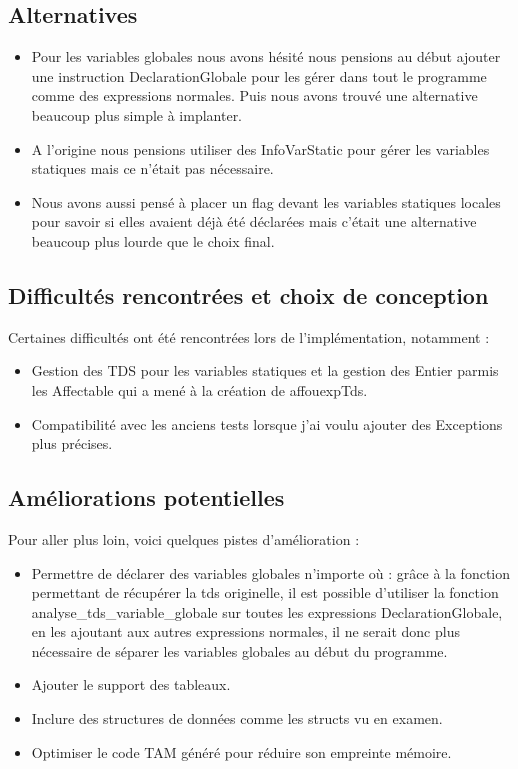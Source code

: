 \documentclass[a4paper,12pt]{article}
\begin{document}
\subsection{Alternatives}
\begin{itemize}
\item Pour les variables globales nous avons hésité nous pensions au début ajouter une instruction DeclarationGlobale pour les gérer dans tout le programme comme des expressions normales. Puis nous avons trouvé une alternative beaucoup plus simple à implanter.

\item A l'origine nous pensions utiliser des InfoVarStatic pour gérer les variables statiques mais ce n'était pas nécessaire.
\item Nous avons aussi pensé à placer un flag devant les variables statiques locales pour savoir si elles avaient déjà été déclarées mais c'était une alternative beaucoup plus lourde que le choix final.

\end{itemize}

\subsection{Difficult\'es rencontr\'ees et choix de conception}
Certaines difficult\'es ont \'et\'e rencontr\'ees lors de l'impl\'ementation, notamment :
\begin{itemize}
    \item Gestion des TDS pour les variables statiques et la gestion des Entier parmis les Affectable qui a mené à la création de affouexpTds.
    \item Compatibilit\'e avec les anciens tests lorsque j'ai voulu ajouter des Exceptions plus précises.
\end{itemize}

\subsection{Am\'eliorations potentielles}
Pour aller plus loin, voici quelques pistes d'am\'elioration :
\begin{itemize}
    \item Permettre de déclarer des variables globales n'importe où : grâce à la fonction permettant de récupérer la tds originelle, il est possible d'utiliser la fonction analyse\_tds\_variable\_globale sur toutes les expressions DeclarationGlobale, en les ajoutant aux autres expressions normales, il ne serait donc plus nécessaire de séparer les variables globales au début du programme.
    \item Ajouter le support des tableaux.
    \item Inclure des structures de donn\'ees comme les structs vu en examen.
    \item Optimiser le code TAM g\'en\'er\'e pour r\'eduire son empreinte m\'emoire.
\end{itemize}
\end{document}
